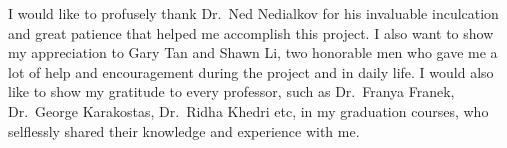 
 I would like to profusely thank Dr.\ Ned Nedialkov for his invaluable inculcation and great patience that helped me accomplish this project. I also want to show my appreciation to Gary Tan and Shawn Li, two honorable men who gave me a lot of help and encouragement during the project and in daily life. I would also like to show my gratitude to every professor, such as Dr.\ Franya Franek, Dr.\ George Karakostas, Dr.\ Ridha Khedri etc, in my graduation courses, who selflessly shared their knowledge and experience with me.
 
 
